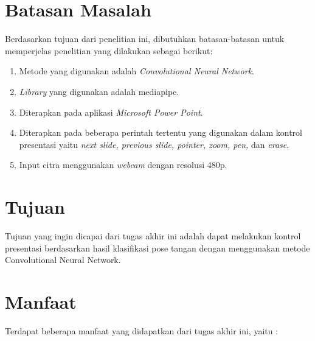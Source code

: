 \section{Batasan Masalah}
\label{sec:batasanmasalah}

Berdasarkan tujuan dari penelitian ini, dibutuhkan batasan-batasan untuk memperjelas penelitian yang dilakukan sebagai berikut:

\begin{enumerate}[nolistsep]

  \item Metode yang digunakan adalah \emph{Convolutional Neural Network}.
  \item \emph{Library} yang digunakan adalah mediapipe.
  \item Diterapkan pada aplikasi \emph{Microsoft Power Point}.
  \item Diterapkan pada beberapa perintah tertentu yang digunakan dalam kontrol presentasi yaitu \emph{next slide, previous slide, pointer, zoom, pen,} dan \emph{erase}.
  \item Input citra menggunakan \emph{webcam} dengan resolusi 480p.

\end{enumerate}

\section{Tujuan}
\label{sec:tujuan}

Tujuan yang ingin dicapai dari tugas akhir ini adalah dapat melakukan kontrol presentasi berdasarkan hasil klasifikasi pose tangan dengan menggunakan metode Convolutional Neural Network.


\section{Manfaat}
\label{sec:manfaat}

Terdapat beberapa manfaat yang didapatkan dari tugas akhir ini, yaitu :

